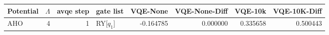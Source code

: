 \begin{tabular}{lrrlrrrr}
\toprule
Potential & $\Lambda$ & avqe step & gate list & VQE-None & VQE-None-Diff & VQE-10k & VQE-10K-Diff \\
\midrule
AHO & 4 & 1 & RY[$q_1$] & -0.164785 & 0.000000 & 0.335658 & 0.500443 \\
\bottomrule
\end{tabular}
